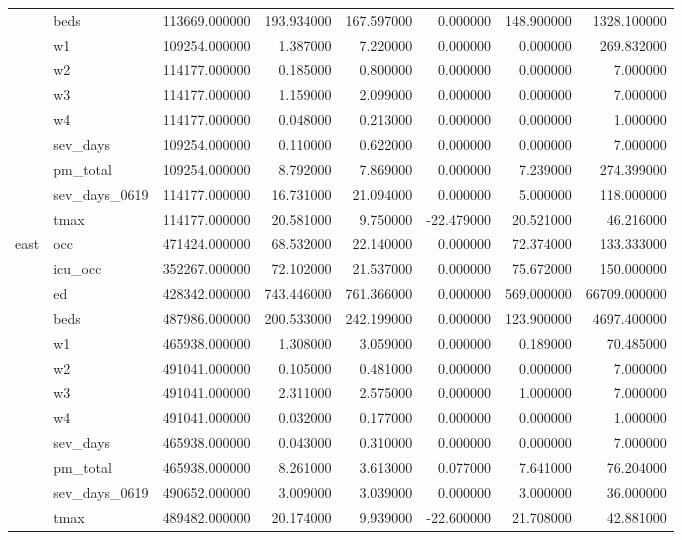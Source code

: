 \begin{tabular}{llrrrrrr}
 & beds & 113669.000000 & 193.934000 & 167.597000 & 0.000000 & 148.900000 & 1328.100000 \\
 & w1 & 109254.000000 & 1.387000 & 7.220000 & 0.000000 & 0.000000 & 269.832000 \\
 & w2 & 114177.000000 & 0.185000 & 0.800000 & 0.000000 & 0.000000 & 7.000000 \\
 & w3 & 114177.000000 & 1.159000 & 2.099000 & 0.000000 & 0.000000 & 7.000000 \\
 & w4 & 114177.000000 & 0.048000 & 0.213000 & 0.000000 & 0.000000 & 1.000000 \\
 & sev_days & 109254.000000 & 0.110000 & 0.622000 & 0.000000 & 0.000000 & 7.000000 \\
 & pm_total & 109254.000000 & 8.792000 & 7.869000 & 0.000000 & 7.239000 & 274.399000 \\
 & sev_days_0619 & 114177.000000 & 16.731000 & 21.094000 & 0.000000 & 5.000000 & 118.000000 \\
 & tmax & 114177.000000 & 20.581000 & 9.750000 & -22.479000 & 20.521000 & 46.216000 \\
\cline{1-8}
\multirow[t]{12}{*}{east} & occ & 471424.000000 & 68.532000 & 22.140000 & 0.000000 & 72.374000 & 133.333000 \\
 & icu_occ & 352267.000000 & 72.102000 & 21.537000 & 0.000000 & 75.672000 & 150.000000 \\
 & ed & 428342.000000 & 743.446000 & 761.366000 & 0.000000 & 569.000000 & 66709.000000 \\
 & beds & 487986.000000 & 200.533000 & 242.199000 & 0.000000 & 123.900000 & 4697.400000 \\
 & w1 & 465938.000000 & 1.308000 & 3.059000 & 0.000000 & 0.189000 & 70.485000 \\
 & w2 & 491041.000000 & 0.105000 & 0.481000 & 0.000000 & 0.000000 & 7.000000 \\
 & w3 & 491041.000000 & 2.311000 & 2.575000 & 0.000000 & 1.000000 & 7.000000 \\
 & w4 & 491041.000000 & 0.032000 & 0.177000 & 0.000000 & 0.000000 & 1.000000 \\
 & sev_days & 465938.000000 & 0.043000 & 0.310000 & 0.000000 & 0.000000 & 7.000000 \\
 & pm_total & 465938.000000 & 8.261000 & 3.613000 & 0.077000 & 7.641000 & 76.204000 \\
 & sev_days_0619 & 490652.000000 & 3.009000 & 3.039000 & 0.000000 & 3.000000 & 36.000000 \\
 & tmax & 489482.000000 & 20.174000 & 9.939000 & -22.600000 & 21.708000 & 42.881000 \\
\cline{1-8}
\bottomrule
\end{tabular}
